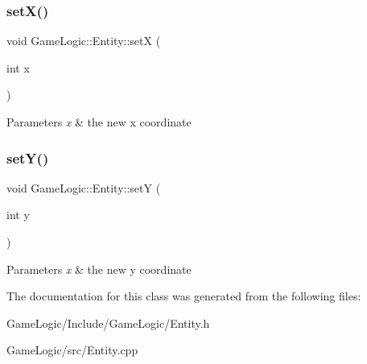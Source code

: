 \subsubsection{\texorpdfstring{set\+X()}{setX()}}
{\footnotesize\ttfamily void Game\+Logic\+::\+Entity\+::setX (\begin{DoxyParamCaption}\item[{int}]{x }\end{DoxyParamCaption})}


\begin{DoxyParams}{Parameters}
{\em x} & the new x coordinate \\
\hline
\end{DoxyParams}
\mbox{\label{classGameLogic_1_1Entity_a246c3603f576c080df17978b483ada45}} 
\subsubsection{\texorpdfstring{set\+Y()}{setY()}}
{\footnotesize\ttfamily void Game\+Logic\+::\+Entity\+::setY (\begin{DoxyParamCaption}\item[{int}]{y }\end{DoxyParamCaption})}


\begin{DoxyParams}{Parameters}
{\em x} & the new y coordinate \\
\hline
\end{DoxyParams}


The documentation for this class was generated from the following files\+:\begin{DoxyCompactItemize}
\item 
Game\+Logic/\+Include/\+Game\+Logic/Entity.\+h\item 
Game\+Logic/src/Entity.\+cpp\end{DoxyCompactItemize}
